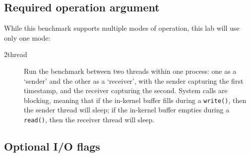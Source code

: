 \documentclass[a4paper,10pt]{article}
\begin{document}
\subsection*{Required operation argument}

While this benchmark supports multiple modes of operation, this lab will use
only one mode:


\begin{description}

\item[2thread] Run the benchmark between two threads within one process: one
  as a `sender' and the other as a `receiver', with the sender capturing the
  first timestamp, and the receiver capturing the second.
  System calls are blocking, meaning that if the in-kernel buffer fills
  during a \texttt{write()}, then the sender thread will sleep; if the
  in-kernel buffer empties during a \texttt{read()}, then the receiver thread
  will sleep.

\end{description}

\subsection*{Optional I/O flags}
\end{document}
